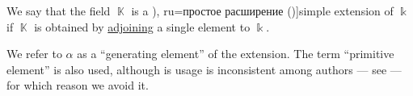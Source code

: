 \begin{definition}\label{def:simple_field_extension}
  We say that the field \( \BbbK \) is a \term[bg=просто разширение (\cite[def. VI.3]{ГеновМиховскиМоллов1991Алгебра}), ru=простое расширение (\cite[409]{Винберг2014КурсАлгебры})]{simple extension} of \( \Bbbk \) if \( \BbbK \) is obtained by \hyperref[def:field_adjunction]{adjoining} a single element to \( \Bbbk \).
\end{definition}
\begin{comments}
  \item We refer to \( \alpha \) as a \enquote{generating element} of the extension. The term \enquote{primitive element} is also used, although is usage is inconsistent among authors --- see  --- for which reason we avoid it.
\end{comments}

